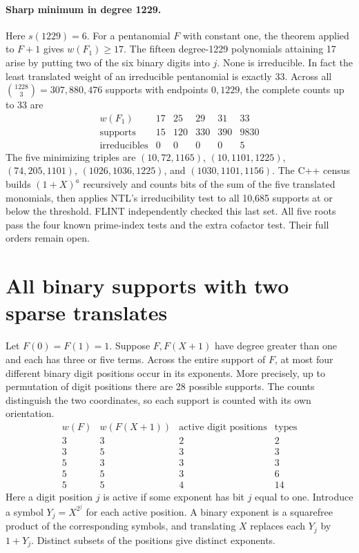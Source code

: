 \documentclass[11pt]{article}
\begin{document}
\paragraph{Sharp minimum in degree 1229.}
Here \(s(1229)=6\). For a pentanomial \(F\) with constant one,
the theorem applied to \(F+1\) gives \(w(F_1)\ge17\).
The fifteen degree-1229 polynomials attaining 17 arise by putting
two of the six binary digits into \(j\). None is irreducible.
In fact the least translated weight of an irreducible pentanomial
is exactly 33. Across all \(\binom{1228}{3}=307{,}880{,}476\) supports
with endpoints \(0,1229\), the complete counts up to 33 are
\[
\begin{array}{c|rrrrr}
 w(F_1)&17&25&29&31&33\\ \hline
 \text{supports}&15&120&330&390&9830\\
 \text{irreducibles}&0&0&0&0&5
\end{array}
\]
The five minimizing triples are \((10,72,1165)\), \((10,1101,1225)\),
\((74,205,1101)\), \((1026,1036,1225)\), and \((1030,1101,1156)\).
The C++ census builds \((1+X)^a\) recursively and counts bits of the
sum of the five translated monomials, then applies NTL's irreducibility
test to all 10,685 supports at or below the threshold. FLINT
independently checked this last set. All five roots pass the four
known prime-index tests and the extra cofactor test. Their full orders
remain open.

\section{All binary supports with two sparse translates}
\label{sec:translated-support-types}
Let \(F(0)=F(1)=1\). Suppose \(F,F(X+1)\) have degree greater than
one and each has three or five terms. Across the entire support of
\(F\), at most four different binary digit positions occur in its
exponents. More precisely, up to permutation of digit positions
there are 28 possible supports. The counts distinguish the two
coordinates, so each support is counted with its own orientation.
\[
\begin{array}{c|c|c|r}
 w(F)&w(F(X+1))&\text{active digit positions}&\text{types}\\ \hline
 3&3&2&2\\
 3&5&3&3\\
 5&3&3&3\\
 5&5&3&6\\
 5&5&4&14
\end{array}
\]
Here a digit position \(j\) is active if some exponent has bit \(j\)
equal to one. Introduce a symbol \(Y_j=X^{2^j}\) for each active
position. A binary exponent is a squarefree product of the corresponding
symbols, and translating \(X\) replaces each \(Y_j\) by \(1+Y_j\).
Distinct subsets of the positions give distinct exponents.
\end{document}
